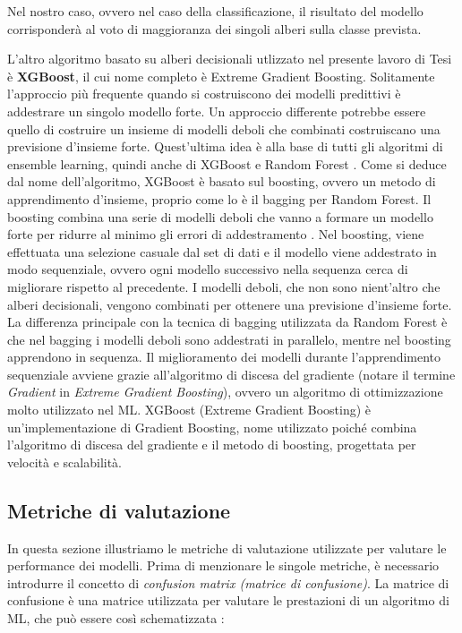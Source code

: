 Nel nostro caso, ovvero nel caso della classificazione, il risultato del modello corrisponder\`a al voto di maggioranza dei singoli alberi sulla classe prevista.

\vspace{1.7cm}

L'altro algoritmo basato su alberi decisionali utlizzato nel presente lavoro di Tesi \`e \textbf{XGBoost}, il cui nome completo \`e Extreme Gradient Boosting. Solitamente l'approccio pi\`u frequente quando si costruiscono dei modelli predittivi \`e addestrare un singolo modello forte. Un approccio differente potrebbe essere quello di costruire un insieme di modelli deboli che combinati costruiscano una previsione d'insieme forte. Quest'ultima idea \`e alla base di tutti gli algoritmi di ensemble learning, quindi anche di XGBoost e Random Forest \cite{gradient_boost}.
Come si deduce dal nome dell'algoritmo, XGBoost \`e basato sul boosting, ovvero un metodo di apprendimento d'insieme, proprio come lo \`e il bagging per Random Forest. Il boosting combina una serie di modelli deboli che vanno a formare un modello forte per ridurre al minimo gli errori di addestramento \cite{xgb}. Nel boosting, viene effettuata una selezione casuale dal set di dati e il modello viene addestrato in modo sequenziale, ovvero ogni modello successivo nella sequenza cerca di migliorare rispetto al precedente. I modelli deboli, che non sono nient'altro che alberi decisionali, vengono combinati per ottenere una previsione d'insieme forte. La differenza principale con la tecnica di bagging utilizzata da Random Forest \`e che nel bagging i modelli deboli sono addestrati in parallelo, mentre nel boosting apprendono in sequenza. Il miglioramento dei modelli durante l'apprendimento sequenziale avviene grazie all'algoritmo di discesa del gradiente (notare il termine \textit{Gradient} in  \textit{Extreme Gradient Boosting}), ovvero un algoritmo di ottimizzazione molto utilizzato nel ML.
XGBoost (Extreme Gradient Boosting) \`e un'implementazione di Gradient Boosting, nome utilizzato poich\'e combina l'algoritmo di discesa del gradiente e il metodo di boosting, progettata per velocit\`a e scalabilit\`a.


\subsection{Metriche di valutazione}
In questa sezione illustriamo le metriche di valutazione utilizzate per valutare le performance dei modelli. Prima di menzionare le singole metriche, \`e necessario introdurre il concetto di \textit{confusion matrix (matrice di confusione)}. La matrice di confusione \`e una matrice utilizzata per valutare le prestazioni di un algoritmo di ML, che pu\`o essere cos\`i schematizzata \cite{mcc}:

